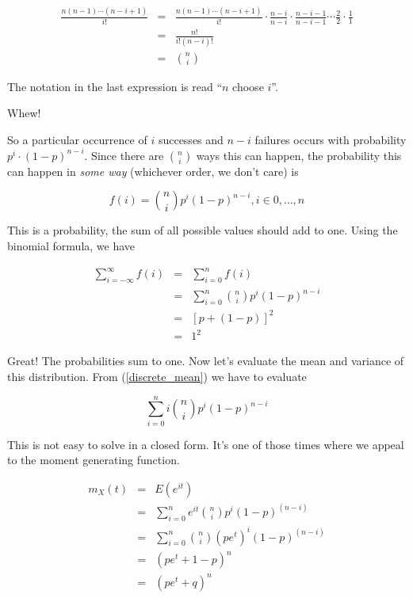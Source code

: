 \documentclass[]{article}
\begin{document}
\begin{eqnarray*}
\frac{n(n-1) \cdots (n-i+1)}{i!} & = & \frac{n(n-1) \cdots (n-i+1)}{i!} \cdot
         \frac{n-i}{n-i} \cdot \frac{n-i-1}{n-i-1} \cdots 
         \frac{2}{2} \cdot \frac{1}{1} \\
      & = & \frac{n!}{i! (n-i)!} \\
      & = & {n \choose i}
\end{eqnarray*}

The notation in the last expression is read ``$n$ choose $i$''.

Whew!

So a particular occurrence of $i$ successes and $n-i$
failures occurs with probability $p^i \cdot (1-p)^{n-i}$.
Since there are ${n \choose i}$ ways this can happen, the
probability this can happen in \emph{some way} 
(whichever order, we don't care) is

\begin{equation} \label{binomial_density}
f(i) = {n \choose i} p^i (1-p)^{n-i}, i \in 0, \ldots, n
\end{equation}

This is a probability, the sum of all possible values
should add to one.  Using the binomial formula, we have

\begin{eqnarray*}
\sum_{i=-\infty}^{\infty} f(i) & = & \sum_{i=0}^{n} f(i) \\
   & = & \sum_{i=0}^{n} {n \choose i} p^i (1-p)^{n-i}  \\
   & = & [ p + (1-p) ]^2 \\
   & = & 1^2
\end{eqnarray*}

Great! The probabilities sum to one.  Now let's evaluate
the mean and variance of this distribution.  From
(\ref{discrete_mean}) we have to evaluate

$$
\sum_{i=0}^n i {n \choose i} p^i (1-p)^{n-i}
$$

This is not easy to solve in a closed form.  It's
one of those times where we appeal to the moment generating
function.

\begin{eqnarray*}
m_X(t) & = & E(e^{it}) \\
   & = & \sum_{i=0}^n e^{it} {n \choose i} p^i (1-p)^{(n-i)} \\
   & = & \sum_{i=0}^n {n \choose i} (pe^t)^i (1-p)^{(n-i)} \\
   & = & (pe^t + 1 - p)^n \\
   & = & (pe^t + q)^n
\end{eqnarray*}
\end{document}
